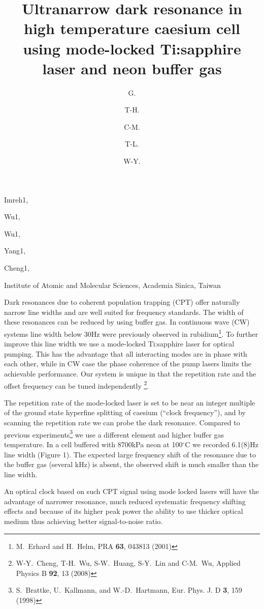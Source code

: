 \documentclass[10pt]{article}
\begin{document}

\title{Ultranarrow dark resonance in high temperature caesium cell using mode-locked Ti:sapphire laser and neon buffer gas}

\begin{authors}
  \author{G.}{Imreh}{1},
  \author{T-H.}{Wu}{1},
  \author{C-M.}{Wu}{1},
  \author{T-L.}{Yang}{1},
  \author{W-Y.}{Cheng}{1},
\end{authors}

\address{1}{Institute of Atomic and Molecular Sciences, Academia Sinica, Taiwan}

\begintext

Dark resonances due to coherent population trapping (CPT) offer naturally narrow line widths and are well suited for frequency standards. The width of these resonances can be reduced by using buffer gas. In continuous wave (CW) systems line width below 30Hz were previously observed in rubidium\footnote{M.~Erhard and H.~Helm, PRA {\bf 63}, 043813 (2001)}. To further improve this line width we use a mode-locked Ti:sapphire laser for optical pumping. This has the advantage that all interacting modes are in phase with each other, while in CW case the phase coherence of the pump lasers limits the achievable performance. Our system is unique in that the repetition rate and the offset frequency can be tuned independently \footnote{W-Y.~Cheng, T-H.~Wu, S-W.~Huang, S-Y.~Lin and C-M.~Wu, Applied Physics B {\bf 92}, 13 (2008)}. 

The repetition rate of the mode-locked laser is set to be near an integer multiple of the ground state hyperfine splitting of caesium (``clock frequency''), and by scanning the repetition rate we can probe the dark resonance. Compared to previous experiments\footnote{S.~Brattke, U.~Kallmann, and W.-D.~Hartmann,  Eur. Phys. J. D {\bf 3}, 159 (1998)} we use a different element and higher buffer gas temperature. In a cell buffered with 8700kPa neon at 100$^\circ$C we recorded 6.1(8)Hz line width (Figure 1). The expected large frequency shift of the resonance due to the buffer gas (several kHz) is absent, the observed shift is much smaller than the line width.

An optical clock based on such CPT signal using mode locked lasers will have the advantage of narrower resonance, much reduced systematic frequency shifting effects and because of its higher peak power the ability to use thicker optical medium thus achieving better signal-to-noise ratio.
\end{document}
